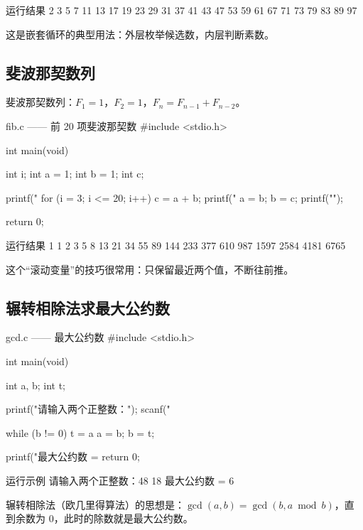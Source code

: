 \begin{outbox}{运行结果}
2 3 5 7 11 13 17 19 23 29 31 37 41 43 47 53 59 61 67 71 73 79 83 89 97
\end{outbox}

这是嵌套循环的典型用法：外层枚举候选数，内层判断素数。

\subsection{斐波那契数列}

斐波那契数列：$F_1 = 1$，$F_2 = 1$，$F_n = F_{n-1} + F_{n-2}$。

\begin{codebox}{fib.c —— 前 20 项斐波那契数}
#include <stdio.h>

int main(void)
{
    int i;
    int a = 1;
    int b = 1;
    int c;

    printf("%
    for (i = 3; i <= 20; i++) {
        c = a + b;
        printf("%
        a = b;
        b = c;
    }
    printf("\n");

    return 0;
}
\end{codebox}

\begin{outbox}{运行结果}
1 1 2 3 5 8 13 21 34 55 89 144 233 377 610 987 1597 2584 4181 6765
\end{outbox}

这个“滚动变量”的技巧很常用：只保留最近两个值，不断往前推。

\subsection{辗转相除法求最大公约数}

\begin{codebox}{gcd.c —— 最大公约数}
#include <stdio.h>

int main(void)
{
    int a, b;
    int t;

    printf("请输入两个正整数：");
    scanf("%

    while (b != 0) {
        t = a %
        a = b;
        b = t;
    }

    printf("最大公约数 = %
    return 0;
}
\end{codebox}

\begin{outbox}{运行示例}
请输入两个正整数：48 18
最大公约数 = 6
\end{outbox}

辗转相除法（欧几里得算法）的思想是：$\gcd(a, b) = \gcd(b, a \bmod b)$，直到余数为 0，此时的除数就是最大公约数。

